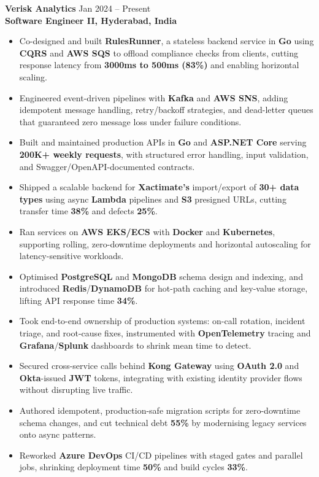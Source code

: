 \documentclass[a4paper,10pt]{article}
\begin{document}
\textbf{Verisk Analytics} \hfill Jan 2024 -- Present \\
\textbf{Software Engineer II, Hyderabad, India}

\begin{itemize}[leftmargin=*]
    \item Co-designed and built \textbf{RulesRunner}, a stateless backend service in \textbf{Go} using \textbf{CQRS} and \textbf{AWS SQS} to offload compliance checks from clients, cutting response latency from \textbf{3000ms to 500ms (83\%)} and enabling horizontal scaling.
    \item Engineered event-driven pipelines with \textbf{Kafka} and \textbf{AWS SNS}, adding idempotent message handling, retry/backoff strategies, and dead-letter queues that guaranteed zero message loss under failure conditions.
    \item Built and maintained production APIs in \textbf{Go} and \textbf{ASP.NET Core} serving \textbf{200K+ weekly requests}, with structured error handling, input validation, and Swagger/OpenAPI-documented contracts.
    \item Shipped a scalable backend for \textbf{Xactimate's} import/export of \textbf{30+ data types} using async \textbf{Lambda} pipelines and \textbf{S3} presigned URLs, cutting transfer time \textbf{38\%} and defects \textbf{25\%}.
    \item Ran services on \textbf{AWS EKS/ECS} with \textbf{Docker} and \textbf{Kubernetes}, supporting rolling, zero-downtime deployments and horizontal autoscaling for latency-sensitive workloads.
    \item Optimised \textbf{PostgreSQL} and \textbf{MongoDB} schema design and indexing, and introduced \textbf{Redis}/\textbf{DynamoDB} for hot-path caching and key-value storage, lifting API response time \textbf{34\%}.
    \item Took end-to-end ownership of production systems: on-call rotation, incident triage, and root-cause fixes, instrumented with \textbf{OpenTelemetry} tracing and \textbf{Grafana}/\textbf{Splunk} dashboards to shrink mean time to detect.
    \item Secured cross-service calls behind \textbf{Kong Gateway} using \textbf{OAuth 2.0} and \textbf{Okta}-issued \textbf{JWT} tokens, integrating with existing identity provider flows without disrupting live traffic.
    \item Authored idempotent, production-safe migration scripts for zero-downtime schema changes, and cut technical debt \textbf{55\%} by modernising legacy services onto async patterns.
    \item Reworked \textbf{Azure DevOps} CI/CD pipelines with staged gates and parallel jobs, shrinking deployment time \textbf{50\%} and build cycles \textbf{33\%}.
\end{itemize}
\end{document}
